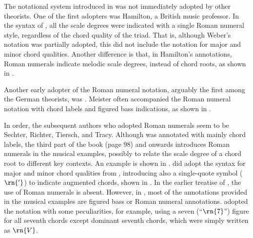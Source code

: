 


The notational system introduced in
\textcite{weber1817versuch} was not immediately adopted by
other theorists. One of the first adopters was Hamilton, a
British music professor. In the syntax of
\textcite{hamilton1840catechism}, all the scale degrees were
indicated with a single Roman numeral style, regardless of
the chord quality of the triad. That is, although Weber's
notation was partially adopted, this did not include the
notation for major and minor chord qualities. Another
difference is that, in Hamilton's annotations, Roman
numerals indicate melodic scale degrees, instead of chord
roots, as shown in
.

Another early adopter of the Roman numeral notation,
arguably the first among the German theorists, was
\textcite{meister1852vollstandige}. Meister often
accompanied the Roman numeral notation with chord labels and
figured bass indications, as shown in
.


In order, the subsequent authors who adopted Roman numerals
seem to be Sechter, Richter, Tiersch, and Tracy. Although
\textcite{sechter1853grundsatze} was annotated with mainly
chord labels, the third part of the book (page 98) and
onwards introduces Roman numerals in the musical examples,
possibly to relate the scale degree of a chord root to
different key contexts. An example is shown in
.
\textcite{richter1860lehrbuch} did adopt the syntax for
major and minor chord qualities from
\textcite{weber1817versuch}, introducing also a single-quote
symbol ($\rn{'}$) to indicate augmented chords, shown in
. In the
earlier treatise of \textcite{tiersch1868system}, the use of
Roman numerals is absent. However, in
\textcite{tiersch1874elementarbuch}, most of the annotations
provided in the musical examples are figured bass or Roman
numeral annotations. \textcite{tracy1878theory} adopted the
notation with some peculiarities, for example, using a seven
(``$\rn{7}$'') figure for all seventh chords except dominant
seventh chords, which were simply written as $\rn{V}$.

